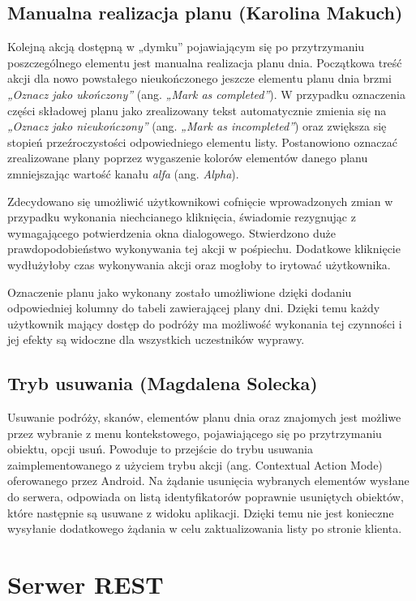 \documentclass[10pt,twoside,a4paper]{report}
\begin{document}
\section{Manualna realizacja planu (Karolina Makuch)}
\par  Kolejną akcją dostępną w „dymku” pojawiającym się po przytrzymaniu poszczególnego elementu jest manualna realizacja planu dnia. Początkowa treść akcji dla nowo powstałego nieukończonego jeszcze elementu planu dnia brzmi \textit{„Oznacz jako ukończony”} (ang. \textit{„Mark as completed”}). W przypadku oznaczenia części składowej planu jako zrealizowany tekst automatycznie zmienia się na \textit{„Oznacz jako nieukończony”} (ang. \textit{„Mark as incompleted”}) oraz zwiększa się stopień przeźroczystości odpowiedniego elementu listy. Postanowiono oznaczać zrealizowane plany poprzez wygaszenie kolorów elementów danego planu zmniejszając wartość kanału \textit{alfa} (ang. \textit{Alpha}).
 \par Zdecydowano się umożliwić użytkownikowi cofnięcie wprowadzonych zmian w przypadku wykonania niechcianego kliknięcia, świadomie rezygnując z wymagającego potwierdzenia okna dialogowego. Stwierdzono duże prawdopodobieństwo wykonywania tej akcji w pośpiechu. Dodatkowe kliknięcie wydłużyłoby czas wykonywania akcji oraz mogłoby to irytować użytkownika.
\par  Oznaczenie planu jako wykonany zostało umożliwione dzięki dodaniu odpowiedniej kolumny do tabeli zawierającej plany dni. Dzięki temu każdy użytkownik mający dostęp do podróży ma możliwość wykonania tej czynności i jej efekty są widoczne dla wszystkich uczestników wyprawy.

\section{Tryb usuwania (Magdalena Solecka)}
\par Usuwanie podróży, skanów, elementów planu dnia oraz znajomych jest możliwe przez wybranie z menu kontekstowego, pojawiającego się po przytrzymaniu obiektu, opcji usuń. Powoduje to przejście do trybu usuwania zaimplementowanego z użyciem trybu akcji (ang. Contextual Action Mode) oferowanego przez Android. Na żądanie usunięcia wybranych elementów wysłane do serwera, odpowiada on listą identyfikatorów poprawnie usuniętych  obiektów, które następnie są usuwane z widoku aplikacji. Dzięki temu nie jest konieczne wysyłanie dodatkowego żądania w celu zaktualizowania listy po stronie klienta.

\chapter{Serwer REST}
\end{document}
